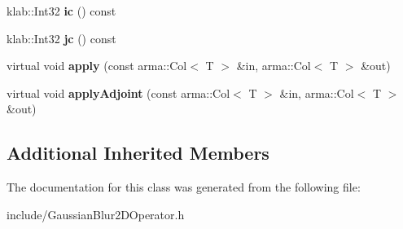 \begin{DoxyCompactItemize}
\item 
klab\+::\+Int32 {\bfseries ic} () const \hypertarget{classkl1p_1_1TGaussianBlur2DOperator_a73bb830da21e3991d276eb85a77759a1}{}\label{classkl1p_1_1TGaussianBlur2DOperator_a73bb830da21e3991d276eb85a77759a1}

\item 
klab\+::\+Int32 {\bfseries jc} () const \hypertarget{classkl1p_1_1TGaussianBlur2DOperator_aa5debbcb9a1393b282bc6394e0ba3fc0}{}\label{classkl1p_1_1TGaussianBlur2DOperator_aa5debbcb9a1393b282bc6394e0ba3fc0}

\item 
virtual void {\bfseries apply} (const arma\+::\+Col$<$ T $>$ \&in, arma\+::\+Col$<$ T $>$ \&out)\hypertarget{classkl1p_1_1TGaussianBlur2DOperator_a58c6d9662606f2af777d677fe71de463}{}\label{classkl1p_1_1TGaussianBlur2DOperator_a58c6d9662606f2af777d677fe71de463}

\item 
virtual void {\bfseries apply\+Adjoint} (const arma\+::\+Col$<$ T $>$ \&in, arma\+::\+Col$<$ T $>$ \&out)\hypertarget{classkl1p_1_1TGaussianBlur2DOperator_ab14f40b91b71d7defbf12023bfb0d296}{}\label{classkl1p_1_1TGaussianBlur2DOperator_ab14f40b91b71d7defbf12023bfb0d296}

\end{DoxyCompactItemize}
\subsection*{Additional Inherited Members}


The documentation for this class was generated from the following file\+:\begin{DoxyCompactItemize}
\item 
include/Gaussian\+Blur2\+D\+Operator.\+h\end{DoxyCompactItemize}
